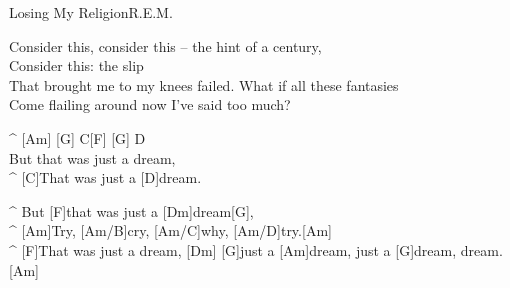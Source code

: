 \begin{song}{Losing My Religion}{R.E.M.}
\begin{guitar}
Consider this, consider this – the hint of a century,\\
Consider this: the slip\\
That brought me to my knees failed. What if all these fantasies\\
Come flailing around now I've said too much?\\
\end{guitar}


\begin{guitar}
^ [Am]   [G] C[F]  [G]             D\\
But that was just a dream,\\
^ [C]That was just a [D]dream.\\
\end{guitar}



\begin{guitar}
^ But [F]that was just a [Dm]dream[G],\\
^ [Am]Try, [Am/B]cry,   [Am/C]why,   [Am/D]try.[Am]\\
^ [F]That was just a dream, [Dm]   [G]just a [Am]dream, just a [G]dream, dream.[Am]\\
\end{guitar}


\end{song}
